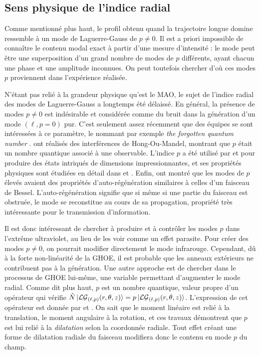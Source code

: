 \subsection{Sens physique de l'indice radial}
Comme mentionné plus haut, le profil obtenu quand la trajectoire longue domine ressemble à un mode de Laguerre-Gauss de $p\neq 0$. Il est a priori impossible de connaître le contenu modal exact à partir d'une mesure d'intensité : le mode peut être une superposition d'un grand nombre de modes de $p$ différents, ayant chacun une phase et une amplitude inconnues. On peut toutefois chercher d'où ces modes $p$ proviennent dans l'expérience réalisée.

N'étant pas relié à la grandeur physique qu'est le MAO, le sujet de l'indice radial des modes de Laguerre-Gauss a longtemps été délaissé. En général, la présence de modes $p\neq 0$ est indésirable et considérée comme du bruit dans la génération d'un mode $(\ell,p=0)$ pur. C'est seulement assez récemment que des équipes se sont intéressées à ce paramètre, le nommant par exemple \textit{the forgotten quantum number} .  ont réalisés des interférences de Hong-Ou-Mandel, montrant que $p$ était un nombre quantique associé à une observable. L'indice $p$ a été utilisé par  et  pour produire des états intriqués de dimensions impressionnantes, et ses propriétés physiques sont étudiées en détail dans  et 	. Enfin,  ont montré que les modes de $p$ élevés avaient des propriétés d'auto-régénération similaires à celles d'un faisceau de Bessel. L'auto-régénération signifie que si même si une partie du faisceau est obstruée, le mode se reconstitue au cours de sa propagation, propriété très intéressante pour le transmission d'information.

Il est donc intéressant de chercher à produire et à contrôler les modes $p$ dans l'extrême ultraviolet, au lieu de les voir comme un effet parasite. Pour créer des modes $p\neq 0$, on pourrait modifier directement le mode infrarouge. Cependant, dû à la forte non-linéarité de la GHOE, il est probable que les anneaux extérieurs ne contribuent pas à la génération. Une autre approche est de chercher dans le processus de GHOE lui-même, une variable permettant d'augmenter le mode radial. Comme dit plus haut, $p$ est un nombre quantique, valeur propre d'un opérateur qui vérifie $\hat{N}\ket{\mathcal{LG}_{(\ell,p)}(r,\theta,z)} = p\ket{\mathcal{LG}_{(\ell,p)}(r,\theta,z)}$. L'expression de cet opérateur est donnée par  et . On sait que le moment linéaire est relié à la translation, le moment angulaire à la rotation, et ces travaux démontrent que $p$ est lui relié à la \textit{dilatation} selon la coordonnée radiale. Tout effet créant une forme de dilatation radiale du faisceau modifiera donc le contenu en mode $p$ du champ.

